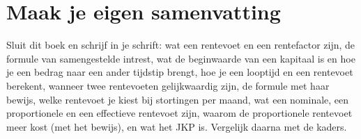 
\ifzelfstudie
\section*{Maak je eigen samenvatting}
Sluit dit boek en schrijf in je schrift: wat een rentevoet en een rentefactor zijn, de formule van samengestelde intrest, wat de beginwaarde van een kapitaal is en hoe je een bedrag naar een ander tijdstip brengt, hoe je een looptijd en een rentevoet berekent, wanneer twee rentevoeten gelijkwaardig zijn, de formule met haar bewijs, welke rentevoet je kiest bij stortingen per maand, wat een nominale, een proportionele en een effectieve rentevoet zijn, waarom de proportionele rentevoet meer kost (met het bewijs), en wat het JKP is. Vergelijk daarna met de kaders.
\fi

